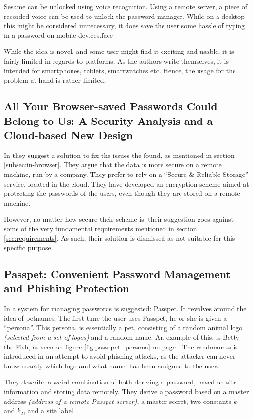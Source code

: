 			Sesame can be unlocked using voice recognition. Using a remote server, a piece of recorded voice can be used to unlock the password manager. While on a desktop this might be considered unnecessary, it does save the user some hassle of typing in a password on mobile devices.face

			While the idea is novel, and some user might find it exciting and usable, it is fairly limited in regards to platforms. As the authors write themselves, it is intended for smartphones, tablets, smartwatches etc. Hence, the usage for the problem at hand is rather limited.

		\subsection*{All Your Browser-saved Passwords Could Belong to Us: A Security Analysis and a Cloud-based New Design}
			In \cite{browser_saved} they suggest a solution to fix the issues the found, as mentioned in section \ref{subsec:in-browser}. They argue that the data is more secure on a remote machine, run by a company. They prefer to rely on a ``Secure \& Reliable Storage'' service, located in the cloud. They have developed an encryption scheme aimed at protecting the passwords of the users, even though they are stored on a remote machine. 

			However, no matter how secure their scheme is, their suggestion goes against some of the very fundamental requirements mentioned in section \ref{sec:requirements}. As such, their solution is dismissed as not suitable for this specific purpose. 

		\subsection*{Passpet: Convenient Password Management and Phishing Protection}
			In \cite{passpet} a system for managing passwords is suggested: Passpet. It revolves around the idea of petnames. The first time the user uses Passpet, he or she is given a ``persona''. This persona, is essentially a pet, consisting of a random animal logo \emph{(selected from a set of logos)} and a random name. An example of this, is Betty the Fish, as seen on figure \ref{fig:passepet_persona} on page \pageref{fig:passepet_persona}. The randomness is introduced in an attempt to avoid phishing attacks, as the attacker can never know exactly which logo and what name, has been assigned to the user.

			They describe a weird combination of both deriving a password, based on site information and storing data remotely. They derive a password based on a master address \emph{(address of a remote Passpet server)}, a master secret, two constants $k_1$ and $k_2$, and a site label.

